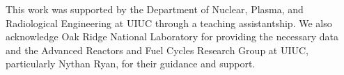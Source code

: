 \documentclass{anstrans}
\begin{document}
This work was supported by the Department of Nuclear, Plasma, and Radiological Engineering at UIUC through a teaching assistantship. We also acknowledge Oak Ridge National Laboratory for providing the necessary data and the Advanced Reactors and Fuel Cycles Research Group at UIUC, particularly Nythan Ryan, for their guidance and support.




\end{document}

